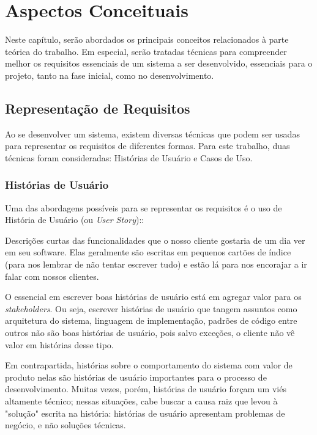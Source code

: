 \chapter{Aspectos Conceituais}
Neste capítulo, serão abordados os principais conceitos relacionados à parte teórica do trabalho. Em especial, serão tratadas técnicas para compreender melhor os requisitos essenciais de um sistema a ser desenvolvido, essenciais para o projeto, tanto na fase inicial, como no desenvolvimento.

\section{Representação de Requisitos}
Ao se desenvolver um sistema, existem diversas técnicas que podem ser usadas para representar os requisitos de diferentes formas. Para este trabalho, duas técnicas foram consideradas: Histórias de Usuário e Casos de Uso.

\subsection{Histórias de Usuário}
Uma das abordagens possíveis para se representar os requisitos é o uso de História de Usuário (ou \textit{User Story}):\cite{jonathanrasmusson}:

\begin{citacaoLonga}
Descrições curtas das funcionalidades que o nosso cliente
gostaria de um dia ver em seu software. Elas geralmente são escritas em pequenos cartões de índice (para nos lembrar de não tentar escrever tudo) e estão lá para nos encorajar a ir falar com nossos clientes.
\end{citacaoLonga}

O essencial em escrever boas histórias de usuário está em agregar valor para os \textit{stakeholders}. Ou seja, escrever histórias de usuário que tangem assuntos como arquitetura do sistema, linguagem de implementação, padrões de código entre outros não são boas histórias de usuário, pois salvo exceções, o cliente não vê valor em histórias desse tipo\cite{jonathanrasmusson}.

Em contrapartida, histórias sobre o comportamento do sistema com valor de produto nelas são histórias de usuário importantes para o processo de desenvolvimento. Muitas vezes, porém, histórias de usuário forçam um viés altamente técnico; nessas situações, cabe buscar a causa raiz que levou à "solução" escrita na história: histórias de usuário apresentam problemas de negócio, e não soluções técnicas.


